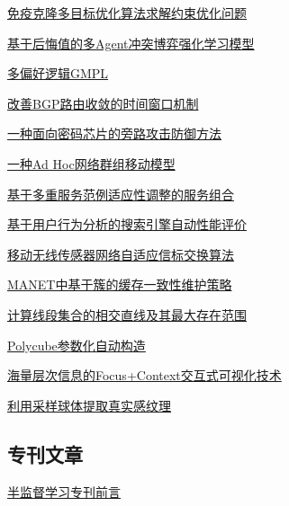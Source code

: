 \documentclass[a4paper]{article}
\begin{document}
\href{http://www.jos.org.cn/ch/reader/download_pdf.aspx?file_no=20081116&year_id=2008&quarter_id=11&falg=1}{免疫克隆多目标优化算法求解约束优化问题}

\href{http://www.jos.org.cn/ch/reader/download_pdf.aspx?file_no=20081117&year_id=2008&quarter_id=11&falg=1}{基于后悔值的多Agent冲突博弈强化学习模型}

\href{http://www.jos.org.cn/ch/reader/download_pdf.aspx?file_no=20081118&year_id=2008&quarter_id=11&falg=1}{多偏好逻辑GMPL}

\href{http://www.jos.org.cn/ch/reader/download_pdf.aspx?file_no=20081119&year_id=2008&quarter_id=11&falg=1}{改善BGP路由收敛的时间窗口机制}

\href{http://www.jos.org.cn/ch/reader/download_pdf.aspx?file_no=20081120&year_id=2008&quarter_id=11&falg=1}{一种面向密码芯片的旁路攻击防御方法}

\href{http://www.jos.org.cn/ch/reader/download_pdf.aspx?file_no=20081121&year_id=2008&quarter_id=11&falg=1}{一种Ad Hoc网络群组移动模型}

\href{http://www.jos.org.cn/ch/reader/download_pdf.aspx?file_no=20081122&year_id=2008&quarter_id=11&falg=1}{基于多重服务范例适应性调整的服务组合}

\href{http://www.jos.org.cn/ch/reader/download_pdf.aspx?file_no=20081123&year_id=2008&quarter_id=11&falg=1}{基于用户行为分析的搜索引擎自动性能评价}

\href{http://www.jos.org.cn/ch/reader/download_pdf.aspx?file_no=20081124&year_id=2008&quarter_id=11&falg=1}{移动无线传感器网络自适应信标交换算法}

\href{http://www.jos.org.cn/ch/reader/download_pdf.aspx?file_no=20081125&year_id=2008&quarter_id=11&falg=1}{MANET中基于簇的缓存一致性维护策略}

\href{http://www.jos.org.cn/ch/reader/download_pdf.aspx?file_no=20081126&year_id=2008&quarter_id=11&falg=1}{计算线段集合的相交直线及其最大存在范围}

\href{http://www.jos.org.cn/ch/reader/download_pdf.aspx?file_no=20081127&year_id=2008&quarter_id=11&falg=1}{Polycube参数化自动构造}

\href{http://www.jos.org.cn/ch/reader/download_pdf.aspx?file_no=20081128&year_id=2008&quarter_id=11&falg=1}{海量层次信息的Focus+Context交互式可视化技术}

\href{http://www.jos.org.cn/ch/reader/download_pdf.aspx?file_no=20081129&year_id=2008&quarter_id=11&falg=1}{利用采样球体提取真实感纹理}

\subsection{专刊文章}
\href{http://www.jos.org.cn/ch/reader/download_pdf.aspx?file_no=20081101&year_id=2008&quarter_id=11&falg=1}{半监督学习专刊前言}
\end{document}
